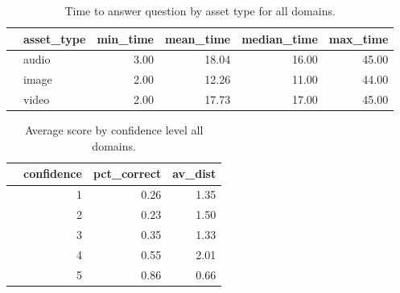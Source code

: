 \documentclass[12pt]{article}
\begin{document}
\begin{table}[ht]
\centering
\begin{tabular}{rlrrrr}
  \hline
 & asset\_type & min\_time & mean\_time & median\_time & max\_time \\ 
  \hline
  & audio & 3.00 & 18.04 & 16.00 & 45.00 \\ 
  & image & 2.00 & 12.26 & 11.00 & 44.00 \\ 
  & video & 2.00 & 17.73 & 17.00 & 45.00 \\ 
   \hline
\end{tabular}
\caption{Time to answer question by asset type for all domains.} 
\end{table}


\begin{table}[ht]
\centering
\begin{tabular}{rrrr}
  \hline
 & confidence & pct\_correct & av\_dist \\ 
  \hline
   &   1 & 0.26 & 1.35 \\ 
   &   2 & 0.23 & 1.50 \\ 
   &   3 & 0.35 & 1.33 \\ 
   &   4 & 0.55 & 2.01 \\ 
   &   5 & 0.86 & 0.66 \\ 
   \hline
\end{tabular}
\caption{Average score by confidence level all domains.} 
\end{table}
\end{document}
